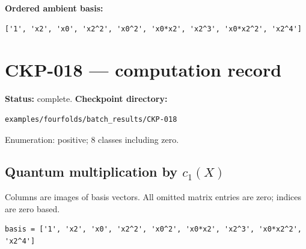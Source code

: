 \documentclass[10pt,a4paper]{article}
\begin{document}
\textbf{Ordered ambient basis:}
\begin{lstlisting}
['1', 'x2', 'x0', 'x2^2', 'x0^2', 'x0*x2', 'x2^3', 'x0*x2^2', 'x2^4']
\end{lstlisting}

\clearpage\section*{CKP-018 --- computation record}
\textbf{Status:} complete.
\textbf{Checkpoint directory:}
\begin{lstlisting}
examples/fourfolds/batch_results/CKP-018
\end{lstlisting}

Enumeration: positive; 8 classes including zero.
\subsection*{Quantum multiplication by $c_1(X)$}
Columns are images of basis vectors. All omitted matrix entries are zero; indices are zero based.

\begin{lstlisting}
basis = ['1', 'x2', 'x0', 'x2^2', 'x0^2', 'x0*x2', 'x2^3', 'x0*x2^2', 'x2^4']
\end{lstlisting}
\end{document}

